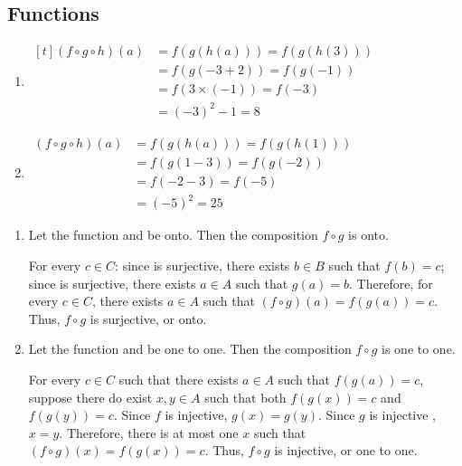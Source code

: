 \subsection{Functions}

\begin{exercise}{9}
  \begin{enumerate}
    \item $\begin{aligned}[t]
            (f \circ g \circ h)(a) &= f(g(h(a))) = f(g(h(3))) \\
                                   &= f(g(-3+2)) = f(g(-1)) \\
                                   &= f(3 \times (-1)) = f(-3) \\
                                   &= (-3)^2-1 = 8
          \end{aligned}$
    \item $\begin{aligned}
            (f \circ g \circ h)(a) &= f(g(h(a))) = f(g(h(1))) \\
                                   &= f(g(1-3)) = f(g(-2)) \\
                                   &= f(-2-3) = f(-5) \\
                                   &= (-5)^2 = 25
          \end{aligned}$
  \end{enumerate}
\end{exercise}

\begin{exercise}{10}
  \begin{enumerate}
    \item Let the function  and  be onto.
          Then the composition $f \circ g$ is onto.

    \Proof{} For every $c \in C$: since  is surjective, there
    exists $b \in B$ such that $f(b) = c$; since  is surjective,
    there exists $a \in A$ such that $g(a) = b$. Therefore, for every $c \in C$,
    there exists $a \in A$ such that $(f \circ g)(a) = f(g(a)) = c$.
    Thus, $f \circ g$ is surjective, or onto. \QED

    \item Let the function  and  be one to one.
          Then the composition $f \circ g$ is one to one.

    \Proof{} For every $c \in C$ such that there exists $a \in A$ such that
    $f(g(a)) = c$, suppose there do exist $x, y \in A$ such that both $f(g(x)) = c$
    and $f(g(y)) = c$. Since $f$ is injective, $g(x) = g(y)$. Since $g$ is injective
    , $x = y$. Therefore, there is at most one $x$ such that $(f \circ g)(x) =
    f(g(x)) = c$. Thus, $f \circ g$ is injective, or one to one. \QED
  \end{enumerate}
\end{exercise}

